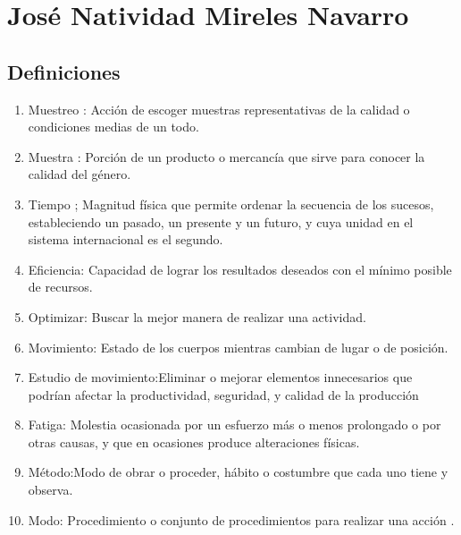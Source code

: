 \section{José Natividad Mireles Navarro}
\subsection{Definiciones}



\begin{enumerate}
    \item Muestreo : Acción de escoger muestras representativas de la calidad o condiciones medias de un todo.
    \item Muestra : Porción de un producto o mercancía que sirve para conocer la calidad del género.
    \item Tiempo ;  Magnitud física que permite ordenar la secuencia de los sucesos, estableciendo un pasado, un presente y un futuro, y cuya unidad en el sistema internacional es el segundo.
    \item Eficiencia: Capacidad de lograr los resultados deseados con el mínimo posible de recursos.
    \item Optimizar: Buscar la mejor manera de realizar una actividad.
    \item Movimiento: Estado de los cuerpos mientras cambian de lugar o de posición.
    \item Estudio de movimiento:Eliminar o mejorar elementos innecesarios que podrían afectar la productividad, seguridad, y calidad de la producción
    \item Fatiga: Molestia ocasionada por un esfuerzo más o menos prolongado o por otras causas, y que en ocasiones produce alteraciones físicas.
    \item Método:Modo de obrar o proceder, hábito o costumbre que cada uno tiene y observa.
    \item Modo: Procedimiento o conjunto de procedimientos para realizar una acción \cite{RAE}.
\end{enumerate}

